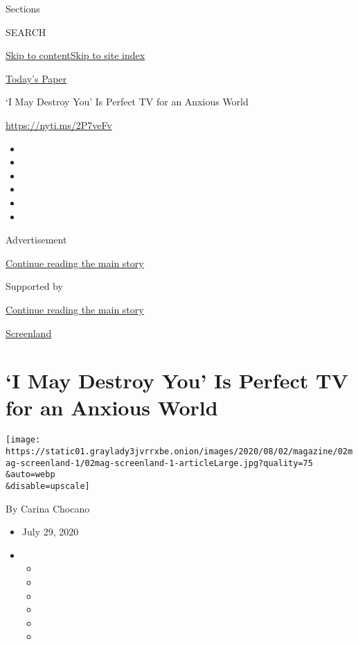 Sections

SEARCH

\protect\hyperlink{site-content}{Skip to
content}\protect\hyperlink{site-index}{Skip to site index}

\href{https://myaccount.nytimes3xbfgragh.onion/auth/login?response_type=cookie\&client_id=vi}{}

\href{https://www.nytimes3xbfgragh.onion/section/todayspaper}{Today's
Paper}

`I May Destroy You' Is Perfect TV for an Anxious World

\url{https://nyti.ms/2P7veFv}

\begin{itemize}
\item
\item
\item
\item
\item
\item
\end{itemize}

Advertisement

\protect\hyperlink{after-top}{Continue reading the main story}

Supported by

\protect\hyperlink{after-sponsor}{Continue reading the main story}

\href{/column/screenland}{Screenland}

\hypertarget{i-may-destroy-you-is-perfect-tv-for-an-anxious-world}{%
\section{`I May Destroy You' Is Perfect TV for an Anxious
World}\label{i-may-destroy-you-is-perfect-tv-for-an-anxious-world}}

\texttt{[image: https://static01.graylady3jvrrxbe.onion/images/2020/08/02/magazine/02mag-screenland-1/02mag-screenland-1-articleLarge.jpg?quality=75\\\&auto=webp\\\&disable=upscale]}

By Carina Chocano

\begin{itemize}
\item
  July 29, 2020
\item
  \begin{itemize}
  \item
  \item
  \item
  \item
  \item
  \item
  \end{itemize}
\end{itemize}

